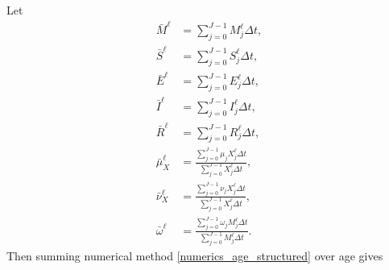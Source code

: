 \documentclass[USenglish]{article}
\begin{document}
Let
\begin{subequations}
  \begin{align}
    \bar{M}^{\ell}
    &= \sum_{j = 0}^{J - 1} M_j^{\ell} \Delta t,
    \\
    \bar{S}^{\ell}
    &= \sum_{j = 0}^{J - 1} S_j^{\ell} \Delta t,
    \\
    \bar{E}^{\ell}
    &= \sum_{j = 0}^{J - 1} E_j^{\ell} \Delta t,
    \\
    \bar{I}^{\ell}
    &= \sum_{j = 0}^{J - 1} I_j^{\ell} \Delta t,
    \\
    \bar{R}^{\ell}
    &= \sum_{j = 0}^{J - 1} R_j^{\ell} \Delta t,
    \\
    \bar{\mu}_X^{\ell}
    &= \frac{\sum_{j = 0}^{J - 1} \mu_j X_j^{\ell} \Delta t}
      {\sum_{j = 0}^{J - 1} X_j^{\ell} \Delta t},
    \\
    \bar{\nu}_X^{\ell}
    &= \frac{\sum_{j = 0}^{J - 1} \nu_j X_j^{\ell} \Delta t}
    {\sum_{j = 0}^{J - 1} X_j^{\ell} \Delta t},
    \\
    \bar{\omega}^{\ell}
    &= \frac{\sum_{j = 0}^{J - 1} \omega_j M_j^{\ell} \Delta t}
    {\sum_{j = 0}^{J - 1} M_j^{\ell} \Delta t}.
  \end{align}
\end{subequations}
Then summing numerical method
\eqref{numerics_age_structured} over age gives
\end{document}
